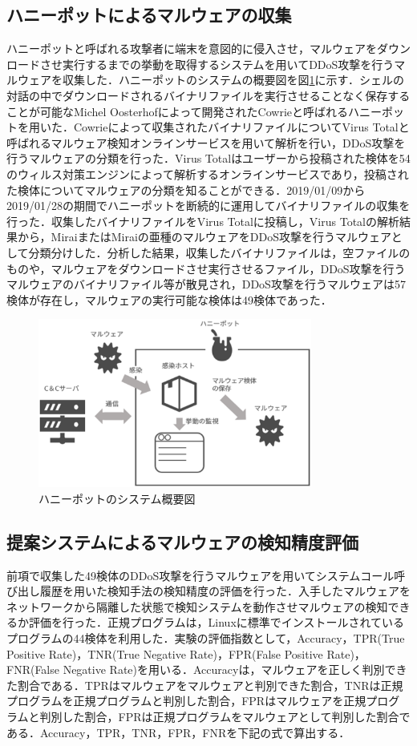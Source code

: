 \subsection{ハニーポットによるマルウェアの収集}
ハニーポットと呼ばれる攻撃者に端末を意図的に侵入させ，マルウェアをダウンロードさせ実行するまでの挙動を取得するシステムを用いてDDoS攻撃を行うマルウェアを収集した．ハニーポットのシステムの概要図を図\ref{fig:honey}に示す．シェルの対話の中でダウンロードされるバイナリファイルを実行させることなく保存することが可能なMichel Oosterhofによって開発されたCowrie\cite{Cowrie}と呼ばれるハニーポットを用いた．Cowrieによって収集されたバイナリファイルについてVirus Totalと呼ばれるマルウェア検知オンラインサービスを用いて解析を行い，DDoS攻撃を行うマルウェアの分類を行った．Virus Total\cite{Virus}はユーザーから投稿された検体を54のウィルス対策エンジンによって解析するオンラインサービスであり，投稿された検体についてマルウェアの分類を知ることができる．2019/01/09から2019/01/28の期間でハニーポットを断続的に運用してバイナリファイルの収集を行った．収集したバイナリファイルをVirus Totalに投稿し，Virus Totalの解析結果から，MiraiまたはMiraiの亜種のマルウェアをDDoS攻撃を行うマルウェアとして分類分けした．分析した結果，収集したバイナリファイルは，空ファイルのものや，マルウェアをダウンロードさせ実行させるファイル，DDoS攻撃を行うマルウェアのバイナリファイル等が散見され，DDoS攻撃を行うマルウェアは57検体が存在し，マルウェアの実行可能な検体は49検体であった．
\begin{figure}[h]
    \centering
       \includegraphics[width=90mm]{figures/honey.eps}
    \caption{ハニーポットのシステム概要図}
    \label{fig:honey}
\end{figure}

\newpage 
\subsection{提案システムによるマルウェアの検知精度評価}
前項で収集した49検体のDDoS攻撃を行うマルウェアを用いてシステムコール呼び出し履歴を用いた検知手法の検知精度の評価を行った．入手したマルウェアをネットワークから隔離した状態で検知システムを動作させマルウェアの検知できるか評価を行った．正規プログラムは，Linuxに標準でインストールされているプログラムの44検体を利用した．実験の評価指数として，Accuracy，TPR(True Positive Rate)，TNR(True Negative Rate)，FPR(False Positive Rate)，FNR(False Negative Rate)を用いる．Accuracyは，マルウェアを正しく判別できた割合である．TPRはマルウェアをマルウェアと判別できた割合，TNRは正規プログラムを正規プログラムと判別した割合，FPRはマルウェアを正規プログラムと判別した割合，FPRは正規プログラムをマルウェアとして判別した割合である．Accuracy，TPR，TNR，FPR，FNRを下記の式で算出する．

